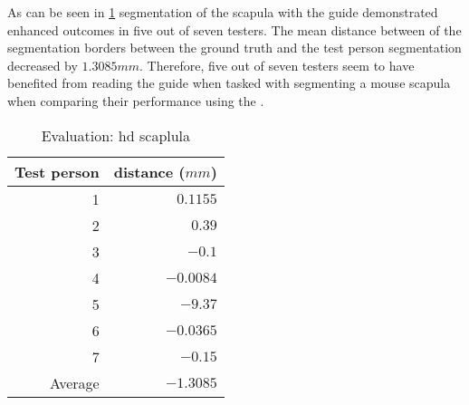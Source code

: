 \noindent
As can be seen in \cref{tab:scapula-distance} segmentation of the scapula with the guide demonstrated enhanced outcomes in five out of seven testers.
The mean distance between of the segmentation borders between the ground truth and the test person segmentation decreased by $1.3085mm$.
Therefore, five out of seven testers seem to have benefited from reading the guide when tasked with segmenting a mouse scapula when 
comparing their performance using the .
\begin{table}[ht]
	\begin{center}
		\begin{tabular}{r r}
			\textbf{Test person} & \textbf{distance ($mm$)} \\
			\hline
			1                    & $0.1155$                 \\
			2                    & $0.39$                   \\
			3                    & $-0.1$                   \\
			4                    & $-0.0084$                \\
			5                    & $-9.37$                  \\
			6                    & $-0.0365$                \\
			7                    & $-0.15$                  \\
			\hline
			Average              & $-1.3085$                \\
		\end{tabular}
		\caption{Evaluation: \acrshort{hd} scaplula}\label{tab:scapula-distance}
	\end{center}
\end{table}


